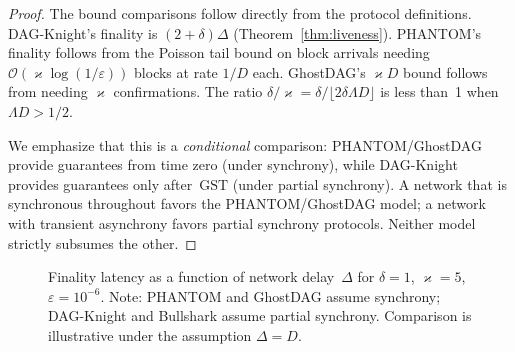 \documentclass[11pt,a4paper]{article}
\theoremstyle{definition}
\theoremstyle{remark}
\newcommand{\DK}{\textsf{DAG-Knight}}
\newcommand{\GST}{\mathrm{GST}}
\renewcommand{\kappa}{\varkappa}
\newcommand{\bigO}{\mathcal{O}}
\begin{document}
\begin{proof}
The bound comparisons follow directly from the protocol definitions.
\DK{}'s finality is $(2 + \delta)\Delta$ (Theorem~\ref{thm:liveness}).
PHANTOM's finality follows from the Poisson tail bound on block
arrivals needing $\bigO(\kappa \log(1/\varepsilon))$ blocks at rate
$1/D$ each.
GhostDAG's $\kappa D$ bound follows from needing $\kappa$ confirmations.
The ratio $\delta/\kappa = \delta / \lfloor 2\delta \Lambda D \rfloor$
is less than~1 when $\Lambda D > 1/2$.

We emphasize that this is a \emph{conditional} comparison:
PHANTOM/GhostDAG provide guarantees from time zero (under synchrony),
while \DK{} provides guarantees only after~$\GST$ (under partial
synchrony).
A network that is synchronous throughout favors the PHANTOM/GhostDAG
model; a network with transient asynchrony favors partial synchrony protocols.
Neither model strictly subsumes the other.
\end{proof}

\begin{figure}[t]
\centering
{}
\caption{Finality latency as a function of network delay~$\Delta$ for
$\delta=1$, $\kappa=5$, $\varepsilon=10^{-6}$.
Note: PHANTOM and GhostDAG assume synchrony; \DK{} and Bullshark assume
partial synchrony.
Comparison is illustrative under the assumption $\Delta = D$.}
\label{fig:finality-comparison}
\end{figure}
\end{document}

